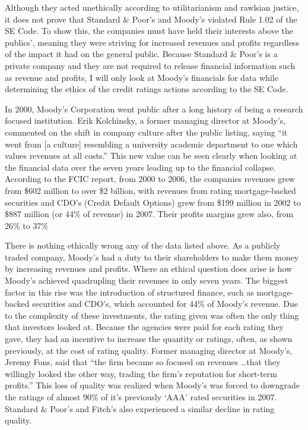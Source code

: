 \documentclass[11pt]{article}
\begin{document}
\begin{multicols}{2}
Although they acted unethically according to utilitarianism and rawlsian justice, it does not prove that Standard \& Poor's and Moody's violated Rule 1.02 of the SE Code.  To show this, the companies must have held their interests above the publics', meaning they were striving for increased revenues and profits regardless of the impact it had on the general public.  Because Standard \& Poor's is a private company and they are not required to release financial information such as revenue and profits, I will only look at Moody's financials for data while determining the ethics of the credit ratings actions according to the SE Code.

In 2000, Moody's Corporation went public after a long history of being a research focused institution.  Erik Kolchinsky, a former managing director at Moody's, commented on the shift in company culture after the public listing, saying ``it went from [a culture] resembling a university academic department to one which values revenues at all costs.'' \cite[p.207]{govtReport}  This new value can be seen clearly when looking at the financial data over the seven years leading up to the financial collapse.  According to the FCIC report, from 2000 to 2006, the companies revenues grew from \$602 million to over \$2 billion, with revenues from rating mortgage-backed securities and CDO's (Credit Default Options) grew from \$199 million in 2002 to \$887 million (or 44\% of revenue) in 2007. Their profits margins grew also, from 26\% to 37\% \cite[p.149]{govtReport}

There is nothing ethically wrong any of the data listed above.  As a publicly traded company, Moody's had a duty to their shareholders to make them money by increasing revenues and profits.  Where an ethical question does arise is how Moody's achieved quadrupling their revenues in only seven years.  The biggest factor in this rise was the introduction of structured finance, such as mortgage-backed securities and CDO's, which accounted for 44\% of Moody's revenue.  Due to the complexity of these investments, the rating given was often the only thing that investors looked at.  Because the agencies were paid for each rating they gave, they had an incentive to increase the quantity or ratings, often, as shown previously, at the cost of rating quality.  Former managing director at Moody's, Jeremy Fons, said that ``the firm became so focused on revenues \ldots that they willingly looked the other way, trading the firm's reputation for short-term profits.'' \cite[p.207]{govtReport} This loss of quality was realized when Moody's was forced to downgrade the ratings of almost 90\% of it's previously `AAA' rated securities in 2007.  Standard \& Poor's and Fitch's also experienced a similar decline in rating quality. \cite[p.212]{govtReport} 


\end{multicols}
\end{document}
